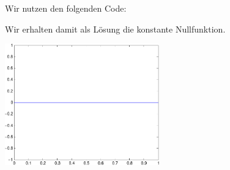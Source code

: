 \section{}

Wir nutzen den folgenden Code:



Wir erhalten damit als Lösung die konstante Nullfunktion.

\begin{center}
  \includegraphics[width = 0.5\textwidth]{chapter_08/exercise_08_41_figure.pdf}
\end{center}
